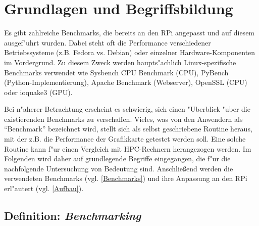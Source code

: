 \chapter{Grundlagen und Begriffsbildung}\label{Kapitel 2}

Es gibt zahlreiche Benchmarks, die bereits an den RPi angepasst und auf diesem ausgef"uhrt wurden. Dabei steht oft die Performance verschiedener Betriebssysteme (z.B. Fedora vs. Debian) oder einzelner Hardware-Komponen\-ten im Vordergrund. Zu diesem Zweck werden haupts"achlich Linux-spezifische Benchmarks verwendet wie Sysbench CPU Benchmark (CPU), PyBench (Python-Implementierung), Apache Benchmark (Webserver), Open\-SSL (CPU) oder ioquake3 (GPU). 

Bei n"aherer Betrachtung erscheint es schwierig, sich einen "Uberblick "uber die existierenden Benchmarks zu verschaffen. Vieles, was von den Anwendern als "`Benchmark"' bezeichnet wird, stellt sich als selbst geschriebene Routine heraus, mit der z.B. die Performance der Grafikkarte getestet werden soll. Eine solche Routine kann f"ur einen Vergleich mit HPC-Rechnern herangezogen werden. Im Folgenden wird daher auf grundlegende Begriffe eingegangen, die f"ur die nachfolgende Untersuchung von Bedeutung sind. Anschlie\ss end werden die verwendeten Benchmarks (vgl. \ref{Benchmarks}) und ihre Anpassung an den RPi erl"autert (vgl. \ref{Aufbau}). 

\section{Definition: \textit{Benchmarking}}\label{Benchmarking}


